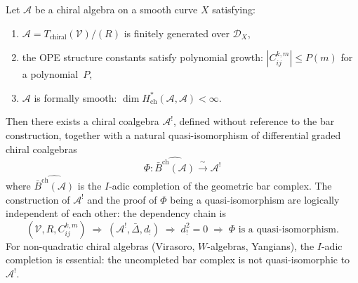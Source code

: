 \begin{corollary}
\label{cor:circularity-free-koszul}
Let $\mathcal{A}$ be a chiral algebra on a smooth curve $X$ satisfying:
\begin{enumerate}[label=\textup{(\roman*)}]
\item\label{hyp:fg} $\mathcal{A} = T_{\mathrm{chiral}}(\mathcal{V})/(R)$ is finitely generated over $\mathcal{D}_X$,
\item\label{hyp:poly} the OPE structure constants satisfy polynomial growth: $|C_{ij}^{k,m}| \leq P(m)$ for a polynomial~$P$,
\item\label{hyp:smooth} $\mathcal{A}$ is formally smooth: $\dim H^*_{\mathrm{ch}}(\mathcal{A},\mathcal{A}) < \infty$.
\end{enumerate}
Then there exists a chiral coalgebra $\mathcal{A}^!$, defined without reference to the bar construction, together with a natural quasi-isomorphism of differential graded chiral coalgebras
\[\Phi \colon \widehat{\bar{B}^{\mathrm{ch}}(\mathcal{A})} \xrightarrow{\;\sim\;} \mathcal{A}^!\]
where $\widehat{\bar{B}^{\mathrm{ch}}(\mathcal{A})}$ is the $I$-adic completion of the geometric bar complex.  The construction of $\mathcal{A}^!$ and the proof of $\Phi$ being a quasi-isomorphism are logically independent of each other: the dependency chain is
\[(\mathcal{V}, R, C_{ij}^{k,m}) \;\Longrightarrow\; (\mathcal{A}^!, \bar\Delta, d_!) \;\Longrightarrow\; d_!^2 = 0 \;\Longrightarrow\; \Phi \text{ is a quasi-isomorphism.}\]
For non-quadratic chiral algebras (Virasoro, $W$-algebras, Yangians), the $I$-adic completion is essential: the uncompleted bar complex is not quasi-isomorphic to $\mathcal{A}^!$.
\end{corollary}

